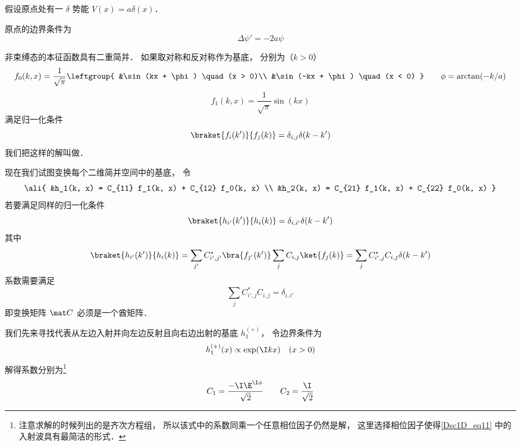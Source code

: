 
假设原点处有一 $\delta$ 势能 $V(x) = a\delta(x)$．

原点的边界条件为
\begin{equation}
\Delta \psi' = -2a \psi
\end{equation}

非束缚态的本征函数具有二重简并． 如果取对称和反对称作为基底， 分别为（$k > 0$）
\begin{equation}
f_0(k, x) = \frac{1}{\sqrt{\pi}}\leftgroup{
&\sin(kx + \phi) \quad (x > 0)\\
&\sin(-kx + \phi) \quad (x < 0)
} \qquad  \phi = \arctan(-k/a)
\end{equation}
\begin{equation}
f_1(k, x) = \frac{1}{\sqrt{\pi}}\sin(kx)
\end{equation}
满足归一化条件
\begin{equation}\label{Dsc1D_eq4}
\braket{f_i(k')}{f_j(k)} = \delta_{i,j} \delta(k - k')
\end{equation}
我们把这样的解叫做．

现在我们试图变换每个二维简并空间中的基底， 令
\begin{equation}\ali{
&h_1(k, x) =  C_{11} f_1(k, x) + C_{12} f_0(k, x) \\
&h_2(k, x) =  C_{21} f_1(k, x) + C_{22} f_0(k, x)
}\end{equation}
若要满足同样的归一化条件
\begin{equation}\label{Dsc1D_eq6}
\braket{h_{i'}(k')}{h_i(k)} = \delta_{i,i'}\delta(k - k')
\end{equation}
其中
\begin{equation}
\braket{h_{i'}(k')}{h_i(k)} = \sum_{j'} C_{i',j'}^* \bra{f_{j'}(k')} \sum_j C_{i, j} \ket{f_j(k)} = \sum_j C_{i', j}^* C_{i, j} \delta(k - k')
\end{equation}
系数需要满足
\begin{equation}
 \sum_j C_{i', j}^* C_{i, j} = \delta_{i, i'}
\end{equation}
即变换矩阵 $\mat C$ 必须是一个酋矩阵．

我们先来寻找代表从左边入射并向左边反射且向右边出射的基底 $h_1^{(+)}$， 令边界条件为
\begin{equation}
h_1^{(+)}(x) \propto \exp(\I k x) \quad (x > 0)
\end{equation}
解得系数分别为\footnote{注意求解的时候列出的是齐次方程组， 所以该式中的系数同乘一个任意相位因子仍然是解， 这里选择相位因子使得\autoref{Dsc1D_eq11} 中的入射波具有最简洁的形式．}
\begin{equation}
C_1 = \frac{-\I\E^{\I \phi}}{\sqrt{2}} \qquad
C_2 =  \frac{\I}{\sqrt{2}}
\end{equation}

